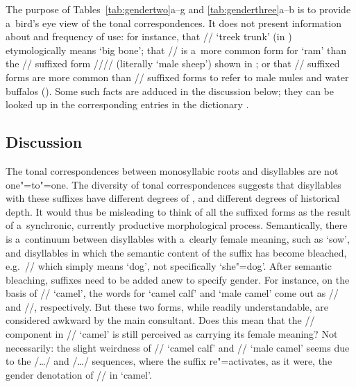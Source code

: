 	The purpose of Tables~\ref{tab:gendertwo}a--g and \ref{tab:genderthree}a--b is to provide a~bird’s eye view of the tonal correspondences. It does not
	present information about  and frequency of use: for instance, that // ‘treek trunk’ (in ) etymologically means ‘big bone’; that
	// is a~more common form for ‘ram’ than the // suffixed form //{\kern2pt}// (literally ‘male sheep’) shown in ; or that
	// suffixed forms are more common than // suffixed forms to refer to male mules and
	water buffalos (). Some such facts are adduced in the discussion below; they can be looked up in the corresponding entries in the dictionary \citep{michauddict2015}.
	
	\clearpage

	\subsection{Discussion}
	\label{sec:thegendersuffixesdisc}
	
	The tonal correspondences between monosyllabic roots and disyllables are not one"=to"=one. The
	diversity of tonal correspondences suggests that disyllables with these suffixes have different degrees
	of , and different degrees of historical depth. It would thus be misleading to think
	of all the suffixed forms as the result of a~synchronic, currently productive morphological
	process. Semantically, there is a~continuum between disyllables with a~clearly female meaning, such
	as ‘sow’, and disyllables in which the semantic content of the suffix has become bleached,
	e.g.~// which simply means ‘dog’, not specifically ‘she"=dog’. After semantic bleaching, suffixes need to be added anew to specify gender. For instance, on the basis of // ‘camel’, the words for ‘camel calf’ and ‘male camel’ come out as // and //, respectively. But these two forms, while readily understandable, are considered awkward by the main consultant. Does this mean that the // component in // ‘camel’ is still perceived as carrying its {female} meaning? Not necessarily: the slight weirdness of // ‘camel calf’ and // ‘male camel’ seems due to the /{\dots}/ and /{\dots}/ sequences, where the suffix re"=activates, as it were, the gender denotation of // in ‘camel’.
	
